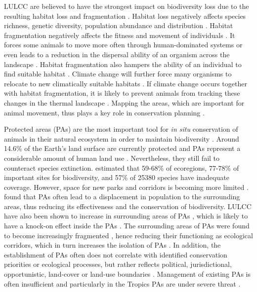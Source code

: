 \documentclass[12pt,a4paper, twoside, english]{article}
\begin{document}
LULCC are believed to have the strongest impact on biodiversity loss due to the resulting habitat loss and fragmentation \citep{Fischer2007}. Habitat loss negatively affects species richness, genetic diversity, population abundance and distribution \citep{Fahrig2003}. Habitat fragmentation negatively affects the fitness and movement of individuals \citep{Cattarino2016}. It forces some animals to move more often through human-dominated systems \citep{Nogeire2015} or even leads to a reduction in the dispersal ability of an organism across the landscape \citep{Opdam2004}. Habitat fragmentation also hampers the ability of an individual to find suitable habitat \citep{Cattarino2016}. Climate change will further force many organisms to relocate to new climatically suitable habitats \citep{Hof2011}. If climate change occurs together with habitat fragmentation, it is likely to prevent animals from tracking these changes in the thermal landscape \citep{Opdam2004}. Mapping the areas, which are important for animal movement, thus plays a key role in conservation planning \citep{Nogeire2015}.

Protected areas (PAs) are the most important tool for \textit{in situ} conservation of animals in their natural ecosystem in order to maintain biodiversity \citep{Chape2005, Rodrigues2004}. Around 14.6\% of the Earth's land surface are currently protected \citep{Butchart2015} and PAs represent a considerable amount of human land use \citep{Chape2005, Foley2005}. Nevertheless, they still fail to counteract species extinction. \cite{Butchart2015} estimated that 59-68\% of ecoregions, 77-78\% of important sites for biodiversity, and 57\% of 25380 species have inadequate coverage. However, space for new parks and corridors is becoming more limited \citep{McKinney2002}. \cite{Wittemyer2008} found that PAs often lead to a displacement in population to the surrounding areas, thus reducing its effectiveness and the conservation of biodiversity. LULCC have also been shown to increase in surrounding areas of PAs \citep{Hansen2004}, which is likely to have a knock-on effect inside the PAs \citep{Willis2015}. The surrounding areas of PAs were found to become increasingly fragmented \citep{Nagendra2008b, Nagendra2009}, hence reducing their functioning as ecological corridors, which in turn increases the isolation of PAs \citep{DeFries2005}. In addition, the establishment of PAs often does not correlate with identified conservation priorities \citep{Chape2005} or ecological processes, but rather reflects political, jurisdictional, opportunistic, land-cover or land-use boundaries \citep{DeFries2010}. Management of existing PAs is often insufficient \citep{Leverington2010} and particularly in the Tropics PAs are under severe threat \citep{Chape2005}. 
\end{document}
